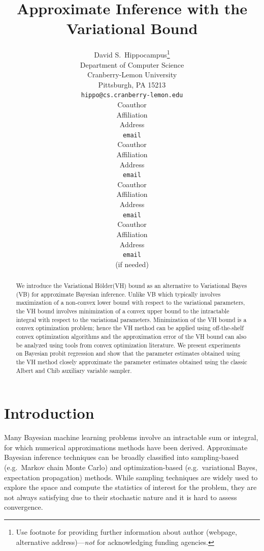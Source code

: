 \documentclass{article} %
\title{Approximate Inference with the Variational \Holder Bound}
\author{
David S.~Hippocampus\thanks{ Use footnote for providing further information
about author (webpage, alternative address)---\emph{not} for acknowledging
funding agencies.} \\
Department of Computer Science\\
Cranberry-Lemon University\\
Pittsburgh, PA 15213 \\
\texttt{hippo@cs.cranberry-lemon.edu} \\
\And
Coauthor \\
Affiliation \\
Address \\
\texttt{email} \\
\AND
Coauthor \\
Affiliation \\
Address \\
\texttt{email} \\
\And
Coauthor \\
Affiliation \\
Address \\
\texttt{email} \\
\And
Coauthor \\
Affiliation \\
Address \\
\texttt{email} \\
(if needed)\\
}
\newcommand{\Holder}{H\"older\xspace}
\newcommand{\red}[1]{{\color{red}#1}}
\begin{document}
\maketitle

\begin{abstract} 
We introduce the Variational \Holder (VH) bound as an alternative to Variational Bayes (VB) for approximate Bayesian inference. Unlike VB which typically involves maximization of a non-convex lower bound with respect to the variational parameters, the VH bound involves minimization of a convex upper bound to the intractable integral with respect to the variational parameters. Minimization of the VH bound is a convex optimization problem; hence the VH method can be applied using off-the-shelf convex optimization algorithms and the approximation error of the VH bound can also be analyzed using tools from convex optimization literature. \red{We present experiments on Bayesian probit regression and show that the parameter estimates obtained using the VH method closely approximate the parameter estimates obtained using the classic Albert and Chib auxiliary variable sampler.}
\end{abstract} 


\section{Introduction}
Many Bayesian machine learning problems involve an intractable sum or integral, for which
numerical approximations methods have been derived. Approximate Bayesian inference techniques can be broadly classified into sampling-based (e.g.~Markov chain Monte Carlo) and optimization-based (e.g.~variational Bayes, expectation propagation) methods.
While sampling techniques
are widely used to explore the space and compute the %
statistics  of
interest for the problem, they are not always satisfying due to their stochastic
nature and it is hard to assess convergence. %
\end{document}
